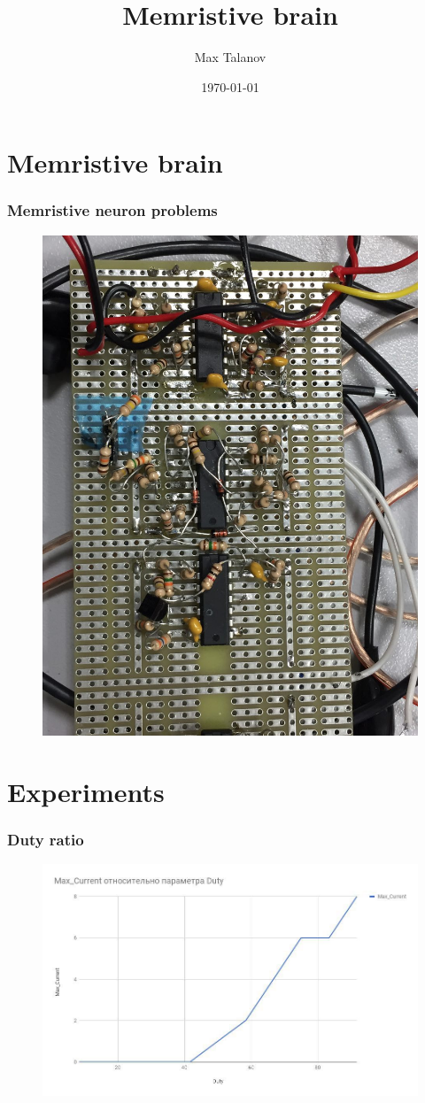 \documentclass[12pt, aspectratio=169]{beamer}
\title[Memristive brain]{Memristive brain} %
\author[Max Talanov]{
  Max Talanov
}
\institute[Neurolab: KFU]%
{
Neuro-biology lab /ITIS, KFU \\ %
\medskip
\textit{max.talanov@gmail.com} %
}
\date{\today} %
\begin{document}
\begin{frame}
\titlepage %
\end{frame}


\section{Memristive brain}

\begin{frame}
  \frametitle{Memristive neuron problems}
  \begin{figure}
    \includegraphics[width=0.4\linewidth, angle=90]{board}
  \end{figure}
\end{frame}

\section{Experiments}

\begin{frame}
  \frametitle{Duty ratio}
\begin{figure}
\includegraphics[width=0.8\linewidth]{duty_ratio}
\end{figure}
\end{frame}
\end{document}
